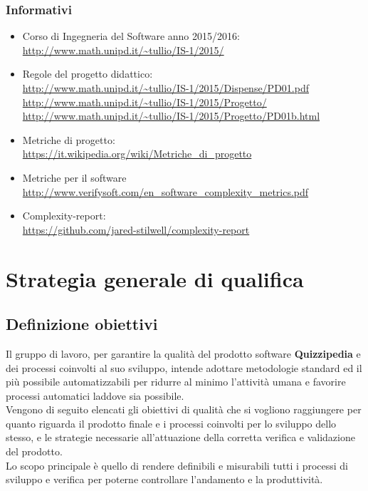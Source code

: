 \documentclass[a4paper,11pt]{article}
\begin{document}
		\subsubsection{Informativi}
		\begin{itemize}
			\item Corso di Ingegneria del Software anno 2015/2016:\\
			\url{http://www.math.unipd.it/~tullio/IS-1/2015/}
			\item Regole del progetto didattico:\\
			\url{http://www.math.unipd.it/~tullio/IS-1/2015/Dispense/PD01.pdf}
			\url{http://www.math.unipd.it/~tullio/IS-1/2015/Progetto/}\\
			\url{http://www.math.unipd.it/~tullio/IS-1/2015/Progetto/PD01b.html}
			\item Metriche di progetto:\\ 
			\url{https://it.wikipedia.org/wiki/Metriche_di_progetto}
			\item Metriche per il software\\
			\url{http://www.verifysoft.com/en_software_complexity_metrics.pdf}
			\item Complexity-report:\\
			\url{https://github.com/jared-stilwell/complexity-report}
		\end{itemize}
	\pagebreak
	
\newpage

\section{Strategia generale di qualifica}
\subsection{Definizione obiettivi}
Il gruppo di lavoro, per garantire la qualità del prodotto software \textbf{Quizzipedia} e dei processi coinvolti al suo sviluppo, intende adottare metodologie standard ed il più possibile automatizzabili per ridurre al minimo l'attività umana e favorire processi automatici laddove sia possibile.\\
Vengono di seguito elencati gli obiettivi di qualità che si vogliono raggiungere per quanto riguarda il prodotto finale e i processi coinvolti per lo sviluppo dello stesso, e le strategie necessarie all'attuazione della corretta verifica e validazione del prodotto.\\
Lo scopo principale è quello di rendere definibili e misurabili tutti i processi di sviluppo e verifica per poterne controllare l'andamento e la produttività. 
\end{document}
